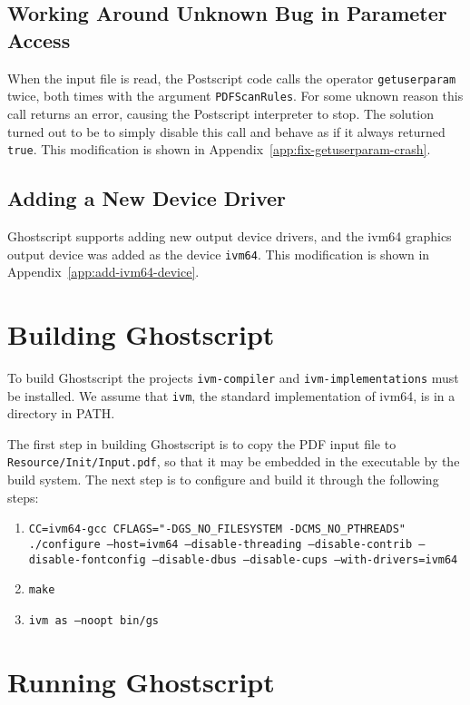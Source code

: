 \documentclass[a4paper,11pt]{article}
\newcommand{\code}[1]{\texttt{#1}}
\begin{document}
\subsection{Working Around Unknown Bug in Parameter Access}

When the input file is read, the Postscript code calls the operator \code{getuserparam} twice, both times with the argument \code{PDFScanRules}.
For some uknown reason this call returns an error, causing the Postscript interpreter to stop.
The solution turned out to be to simply disable this call and behave as if it always returned \code{true}.
This modification is shown in Appendix~\ref{app:fix-getuserparam-crash}.

\subsection{Adding a New Device Driver}

Ghostscript supports adding new output device drivers, and the ivm64 graphics output device was added as the device \code{ivm64}.
This modification is shown in Appendix~\ref{app:add-ivm64-device}.

\section{Building Ghostscript}
\label{sec:building-ghostview}

To build Ghostscript the projects \code{ivm-compiler} and \code{ivm-implementations} must be installed.
We assume that \code{ivm}, the standard implementation of ivm64, is in a directory in PATH.

The first step in building Ghostscript is to copy the PDF input file to \code{Resource/Init/Input.pdf}, so that it may be embedded in the executable by the build system.
The next step is to configure and build it through the following steps:
\begin{enumerate}
\item \code{CC=ivm64-gcc CFLAGS="-DGS\_NO\_FILESYSTEM -DCMS\_NO\_PTHREADS" ./configure --host=ivm64 --disable-threading --disable-contrib --disable-fontconfig --disable-dbus --disable-cups --with-drivers=ivm64}
\item \code{make}
\item \code{ivm as --noopt bin/gs}
\end{enumerate}

\section{Running Ghostscript}
\label{sec:running-ghostview}
\end{document}
